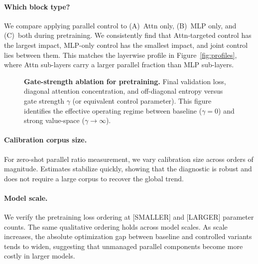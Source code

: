 \paragraph{Which block type?}
We compare applying parallel control to (A)~Attn only, (B)~MLP only,
and (C)~both during pretraining.
We consistently find that Attn-targeted control has the largest impact,
MLP-only control has the smallest impact, and joint control lies between them.
This matches the layerwise profile in Figure~\ref{fig:profiles}, where Attn
sub-layers carry a larger parallel fraction than MLP sub-layers.

\begin{figure}[t]
  \centering
  \fbox{\rule{0pt}{4.8cm}\rule{0.9\linewidth}{0pt}}
  \caption{\textbf{Gate-strength ablation for pretraining.}
           Final validation loss, diagonal attention concentration, and
           off-diagonal entropy versus gate strength $\gamma$ (or equivalent
           control parameter). This figure identifies the effective operating
           regime between baseline ($\gamma=0$) and strong value-space
           ($\gamma\rightarrow\infty$).}
  \label{fig:gate-sweep}
\end{figure}

\paragraph{Calibration corpus size.}
For zero-shot parallel ratio measurement, we vary calibration size across
orders of magnitude.  Estimates stabilize quickly, showing that the diagnostic
is robust and does not require a large corpus to recover the global trend.

\paragraph{Model scale.}
We verify the pretraining loss ordering at [SMALLER] and [LARGER] parameter
counts.
The same qualitative ordering holds across model scales.  As scale increases,
the absolute optimization gap between baseline and controlled variants tends to
widen, suggesting that unmanaged parallel components become more costly in
larger models.

